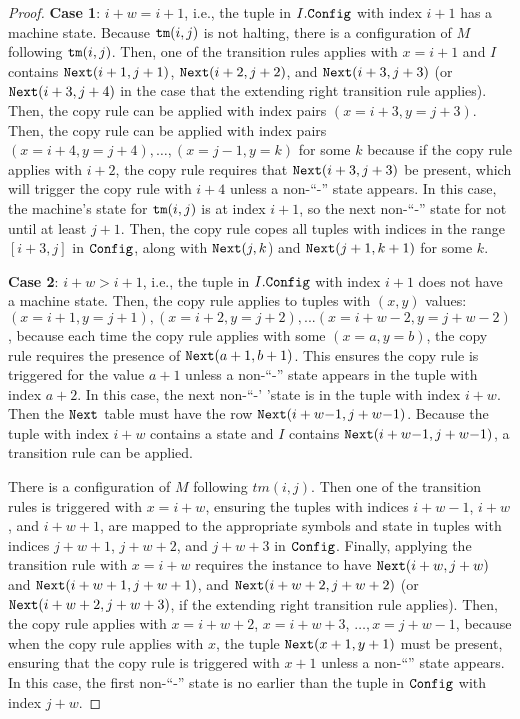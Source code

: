 \begin{proof}
{\bf Case 1}: $i+w=i+1$, i.e., the tuple in $I.\texttt{Config}$ with index $i+1$ has a machine state. 
Because $\texttt{tm}(i,j)$ is not halting,
there is a configuration of $M$ following $\texttt{tm}(i, j)$.
Then, one of the transition rules applies with $x=i+1$ and
$I$ contains
$\texttt{Next}(i+1, j+1)$,
$\texttt{Next}(i+2, j+2)$, and
$\texttt{Next}(i+3, j+3)$
(or $\texttt{Next}(i+3, j+4)$ in the case that the extending right transition rule applies).
Then, the copy rule can be applied with index pairs $(x=i+3, y=j+3)$.
Then, the copy rule can be applied with index pairs $(x=i+4, y=j+4), \dots, (x=j{-}1, y=k)$
for some $k$ because if the copy rule applies with $i+2$,
the copy rule requires that $\texttt{Next}(i+3,j+3)$ be present,
which will trigger the copy rule with $i+4$
unless a non-``-'' state appears.
In this case, the machine's state for $\texttt{tm}(i,j)$ is at index $i+1$,
so the next non-``-'' state for not until at least $j+1$.
Then, the copy rule copes all tuples with indices in the range $[i+3, j]$ in $\texttt{Config}$,
along with $\texttt{Next}(j, k$) and $\texttt{Next}(j+1, k+1)$ for some $k$.


{\bf Case 2}: $i+w>i+1$, i.e., the tuple in $I.\texttt{Config}$ with index $i+1$ does not have a machine state.     
Then, the copy rule applies to tuples with $(x, y)$ values:
$(x=i+1, y=j+1), (x=i+2, y=j+2), ... (x=i+w-2, y=j+w-2)$,
because each time the copy rule applies with some $(x=a, y=b)$,
the copy rule requires the presence of $\texttt{Next}(a+1,b+1)$.
This ensures the copy rule is triggered for the value $a+1$
unless a non-``-'' state appears in the tuple with index $a+2$.
In this case, the next non-``-' 'state is in the tuple with index $i+w$.
Then the $\texttt{Next}$ table must have the row $\texttt{Next}(i+w{-}1, j+w{-}1)$.
Because the tuple with index $i+w$ contains a state
and $I$ contains $\texttt{Next}(i+w{-}1, j+w{-}1)$,
a transition rule can be applied.

There is a configuration of $M$ following $tm(i, j)$.
Then one of the transition rules is triggered with $x=i+w$,
ensuring the tuples with indices $i+w{-}1$, $i+w$, and $i+w+1$,
are mapped to the appropriate symbols and state
in tuples with indices $j+w+1$, $j+w+2$, and $j+w+3$ in $\texttt{Config}$. 
Finally, applying the transition rule with $x=i+w$ requires the instance to have
$\texttt{Next}(i+w, j+w)$ and $\texttt{Next}(i+w+1, j+w+1)$,
and $\texttt{Next}(i+w+2, j+w+2)$
(or $\texttt{Next}(i+w+2, j+w+3)$,
if the extending right transition rule applies).
Then, the copy rule applies with $x=i+w+2$, $x=i+w+3$, $\dots, x=j+w{-}1$,
because when the copy rule applies with $x$,
the tuple $\texttt{Next}(x+1,y+1)$ must be present,
ensuring that the copy rule is triggered with $x+1$ unless a non-``\blank'' state appears.
In this case, the first non-``-'' state is no earlier than the tuple in $\texttt{Config}$ with index $j+w$.


\end{proof}
